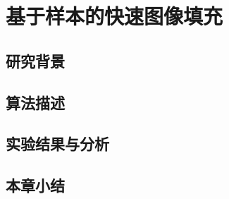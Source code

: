 \chapter{基于样本的快速图像填充}
\label{cha:Inpainting}

\section{研究背景}
\label{background}

\section{算法描述}
\label{algorithm}

\section{实验结果与分析}
\label{results}


\section{本章小结}
\label{conclusions}




